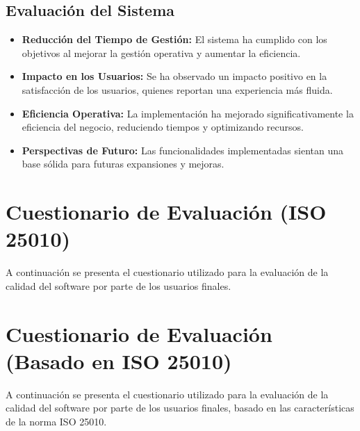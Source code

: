 \documentclass[conference]{IEEEtran}
\begin{document}
\subsection{Evaluación del Sistema}
\begin{itemize}
    \item \textbf{Reducción del Tiempo de Gestión:} El sistema ha cumplido con los objetivos al mejorar la gestión operativa y aumentar la eficiencia.
    \item \textbf{Impacto en los Usuarios:} Se ha observado un impacto positivo en la satisfacción de los usuarios, quienes reportan una experiencia más fluida.
    \item \textbf{Eficiencia Operativa:} La implementación ha mejorado significativamente la eficiencia del negocio, reduciendo tiempos y optimizando recursos.
    \item \textbf{Perspectivas de Futuro:} Las funcionalidades implementadas sientan una base sólida para futuras expansiones y mejoras.
\end{itemize}

\section{Cuestionario de Evaluación (ISO 25010)}
A continuación se presenta el cuestionario utilizado para la evaluación de la calidad del software por parte de los usuarios finales.
\section{Cuestionario de Evaluación (Basado en ISO 25010)}
A continuación se presenta el cuestionario utilizado para la evaluación de la calidad del software por parte de los usuarios finales, basado en las características de la norma ISO 25010.
\end{document}
